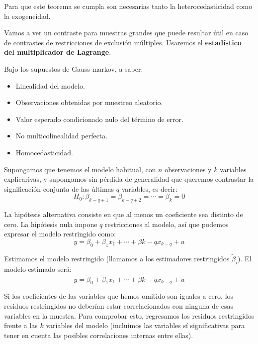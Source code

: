 Para que este teorema se cumpla son necesarias tanto la heterocedasticidad como la exogeneidad.



Vamos a ver un contraste para muestras grandes que puede resultar \'util en caso de contrastes de restricciones de exclusi\'on m\'ultiples. Usaremos el \textbf{estad\'istico del multiplicador de Lagrange}.

Bajo los supuestos de Gauss-markov, a saber:

\begin{itemize}
\item Linealidad del modelo.
\item Observaciones obtenidas por muestreo aleatorio.
\item Valor esperado condicionado nulo del t\'ermino de error.
\item No multicolinealidad perfecta.
\item Homocedasticidad.
\end{itemize}

Supongamos que tenemos el modelo habitual, con $n$ observaciones y $k$ variables explicarivas, y supongamos sin p\'erdida de generalidad que queremos contrastar la significaci\'on conjunta de las \'ultimas $q$ variables, es decir:
\begin{equation*}
H_0:\beta_{k-q+1}=\beta_{k-q+2}=\cdots=\beta_{k}=0
\end{equation*}

La hip\'otesis alternativa consiste en que al menos un coeficiente sea distinto de cero. La hip\'otesis nula impone $q$ restricciones al modelo, as\'i que podemos expresar el modelo restringido como:
\begin{equation*}
y=\beta_0+\beta_1x_1+\cdots+\beta{k-q}x_{k-q}+u
\end{equation*}

Estimamos el modelo restringido (llamamos a los estimadores restringidos $\tilde{\beta}_i$). El modelo estimado ser\'a:
\begin{equation*}
y=\tilde{\beta}_0+\tilde{\beta}_1x_1+\cdots+\tilde{\beta}{k-q}x_{k-q}+\tilde{u}
\end{equation*}

Si los coeficientes de las variables que hemos omitido son iguales a cero, los residuos restringidos no deber\'ian estar correlacionados con ninguna  de esas variables en la muestra. Para comprobar esto, regresamos los residuos restringidos frente a las $k$ variables del modelo (incluimos las variables s\'i significativas para tener en cuenta las posibles correlaciones internas entre ellas).

